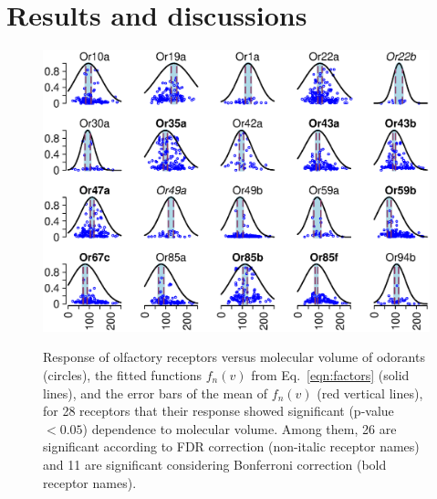 \documentclass[11pt]{paper} %
\newcommand{\numberofreceptors}{ 28 }
\newcommand{\bonferroni}{ 11 }
\newcommand{\fdr}{ 26 }
\begin{document}
\section{Results and discussions}
\begin{figure}
	\centering
		\includegraphics[width=\textwidth]{fig/vol-res}
		\label{fig:vol-res:all}		
	\caption{Response of olfactory receptors  versus molecular volume of odorants (circles),  
			the fitted functions $f_n(v)$ from Eq.~\ref{eqn:factors} (solid lines), 
			and the error bars of the mean of $f_n(v)$ (red vertical lines), 
			for \numberofreceptors receptors that their response showed significant (p-value $<0.05$) dependence to molecular volume. 
			Among them, \fdr are significant according to FDR correction (non-italic receptor names) and 
			\bonferroni are significant considering Bonferroni correction (bold receptor names).
		}
	\label{fig:vol-res}
\end{figure}
\end{document}
